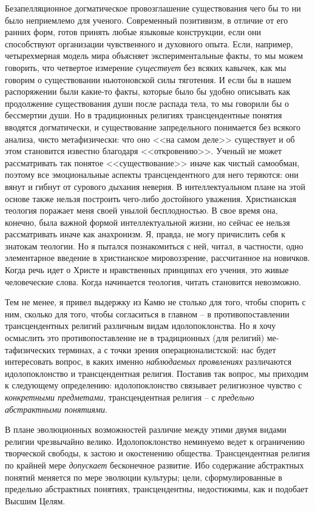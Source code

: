 \documentclass{book}
\begin{document}
Безапелляционное догматическое провозглашение существования чего бы то ни было неприемлемо для ученого. Современ­ный позитивизм, в отличие от его ранних форм, готов принять любые языковые конструкции, если они способствуют организации чувственного и духовного опыта. Если, например, четырехмерная модель мира объясняет экспериментальные факты, то мы можем говорить, что четвертое измерение \textit{существует} без всяких кавычек, как мы говорим о существовании ньютоновской силы тяготения. И если бы в нашем распоряжении были какие-то факты, которые было бы удобно описывать как продолжение существования души после распада тела, то мы говорили бы о бессмертии души. Но в традиционных религиях трансцендентные понятия вводятся догматически, и существование запредельного понимается без всякого анализа, чисто метафизически: что оно <<на самом деле>> существует и об этом становится известно благодаря <<откровению>>. Уче­ный не может рассматривать так понятое <<существование>> иначе как чистый самообман, поэтому все 
эмоциональные 
ас­пекты трансцендентного для него теряются: они вянут и гибнут от сурового дыхания неверия. В интеллектуальном плане на этой основе также нельзя построить чего-либо достойного уважения. Христианская теология поражает меня своей уны­лой бесплодностью. В свое время она, конечно, была важной формой интеллектуальной жизни, но сейчас ее нельзя рассматривать иначе как анахронизм. Я, правда, не могу причислить себя к знатокам теологии. Но я пытался познакомиться с ней, читал, в частности, одно элементарное введение в христианское мировоззрение, рассчитанное на новичков. Когда речь идет о Христе и нравственных принципах его учения, это живые человеческие слова. Когда начинается теология, читать стано­вится невозможно.

Тем не менее, я привел выдержку из Камю не столько для того, чтобы спорить с ним, сколько для того, чтобы согласиться в главном -- в противопоставлении трансцендентных религий различным видам идолопоклонства. Но я хочу осмыслить это противопоставление не в традиционных (для религий) ме­тафизических терминах, а с точки зрения операционалистской: нас будет интересовать вопрос, в каких именно \textit{наблюдаемых проявлениях}  различаются идолопоклонство и трансцендент­ная религия. Поставив так вопрос, мы приходим к следующему определению: идолопоклонство связывает религиозное чувст­во с \textit{конкретными предметами},  трансцендентная религия -- с \textit{предельно абстрактными понятиями}. 

В плане эволюционных возможностей различие между этими двумя видами религии чрезвычайно велико. Идолопоклонство неминуемо ведет к ограничению творческой свободы, к застою и окостенению общества. Трансцендентная религия по край­ней мере \textit{допускает}  бесконечное развитие. Ибо содержание аб­страктных понятий меняется по мере эволюции культуры; це­ли, сформулированные в предельно абстрактных понятиях, трансцендентны, недостижимы, как и подобает Высшим Целям.
\end{document}
